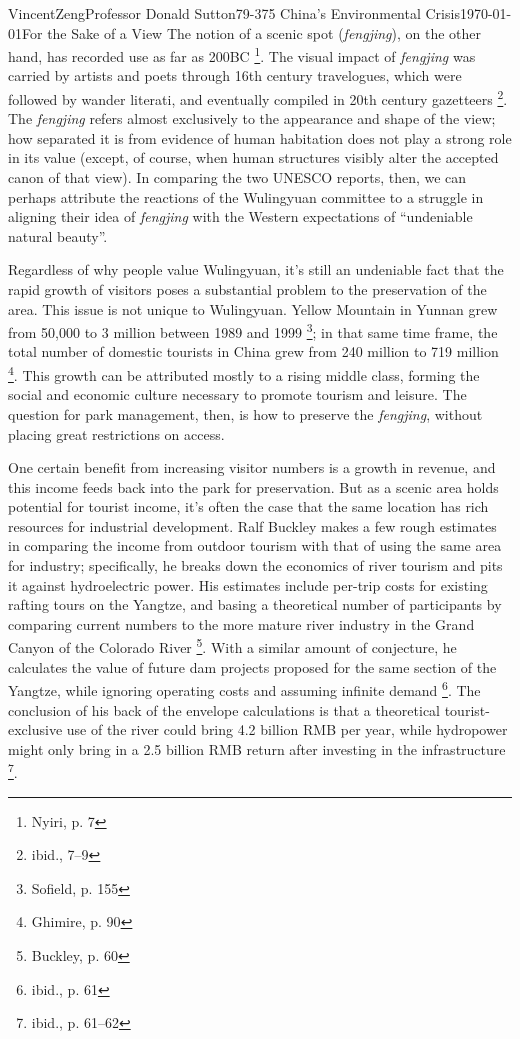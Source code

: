 \documentclass[12pt]{article}
\begin{document}
\begin{mla}{Vincent}{Zeng}{Professor Donald Sutton}{79-375 China's Environmental Crisis}{\today}{For the Sake of a View}
The notion of a scenic spot (\textit{fengjing}), on the other hand, has
recorded use as far as 200BC \footnote{Nyiri, p. 7}. The visual impact of
\textit{fengjing} was carried by artists and poets through 16th century
travelogues, which were followed by wander literati, and eventually compiled in
20th century gazetteers \footnote{ibid., 7--9}. The \textit{fengjing} refers
almost exclusively to the appearance and shape of the view; how separated it is
from evidence of human habitation does not play a strong role in its value
(except, of course, when human structures visibly alter the accepted canon of
that view). In comparing the two UNESCO reports, then, we can perhaps attribute
the reactions of the Wulingyuan committee to a struggle in aligning their idea
of \textit{fengjing} with the Western expectations of ``undeniable natural
beauty''.

Regardless of why people value Wulingyuan, it's still an undeniable fact that
the rapid growth of visitors poses a substantial problem to the preservation of
the area. This issue is not unique to Wulingyuan. Yellow Mountain in Yunnan
grew from 50,000 to 3 million between 1989 and 1999 \footnote{Sofield, p. 155};
in that same time frame, the total number of domestic tourists in China grew
from 240 million to 719 million \footnote{Ghimire, p. 90}. This growth can be
attributed mostly to a rising middle class, forming the social and economic
culture necessary to promote tourism and leisure. The question for park
management, then, is how to preserve the \textit{fengjing}, without placing
great restrictions on access.

One certain benefit from increasing visitor numbers is a growth in revenue, and
this income feeds back into the park for preservation. But as a scenic area
holds potential for tourist income, it's often the case that the same location
has rich resources for industrial development. Ralf Buckley makes a few rough
estimates in comparing the income from
outdoor tourism with that of using the same area for industry; specifically, he
breaks down the economics of river tourism and pits it against hydroelectric
power. His estimates include per-trip costs for existing rafting tours on the Yangtze, and
basing a theoretical number of participants by comparing current numbers to the
more mature river industry in the Grand Canyon of the Colorado River
\footnote{Buckley, p. 60}. With a similar amount of conjecture, he calculates the
value of future  dam projects proposed for the same section of the Yangtze,
while ignoring operating costs and assuming infinite demand \footnote{ibid.,
p. 61}. The conclusion of his back of the envelope calculations is that a
theoretical tourist-exclusive use of the river could bring 4.2 billion RMB per
year, while hydropower might only bring in a 2.5 billion RMB return after
investing in the infrastructure \footnote{ibid., p. 61--62}.


\end{mla}
\end{document}
